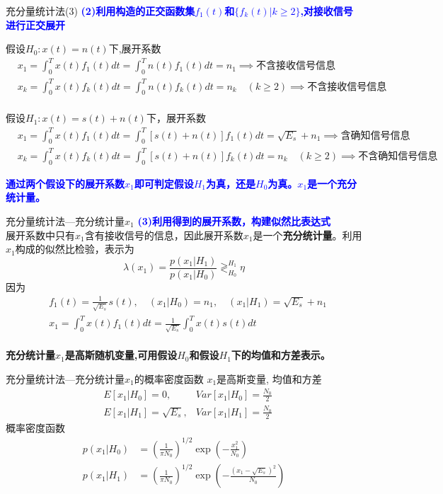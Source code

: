 \begin{frame}[shrink]{充分量统计法(3)}
\textbf{\textcolor{blue}{(2)利用构造的正交函数集$f_1(t)$和$\{f_k(t)|k\ge 2\}$,对接收信号进行正交展开}}
\begin{block}{假设$H_0:x(t)=n(t)$下,展开系数}
\begin{align*}
&x_1=\int_{0}^{T}x(t)f_1(t)dt=\int_{0}^{T}n(t)f_1(t)dt=n_1\implies\text{不含接收信号信息}\\
&x_k=\int_{0}^{T}x(t)f_k(t)dt=\int_{0}^{T}n(t)f_k(t)dt=n_k\quad (k\ge 2)\implies\text{不含接收信号信息}\\
\end{align*}
\end{block}
\begin{block}{假设$H_1:x(t)=s(t)+n(t)$下，展开系数}
\begin{align*}
&x_1=\int_{0}^{T}x(t)f_1(t)dt=\int_{0}^{T}[s(t)+n(t)]f_1(t)dt=\sqrt{E_s}+n_1\implies\text{含确知信号信息}\\
&x_k=\int_{0}^{T}x(t)f_k(t)dt=\int_{0}^{T}[s(t)+n(t)]f_k(t)dt=n_k\quad (k\ge 2)\implies\text{不含确知信号信息}
\end{align*}
\end{block}
\textbf{\textcolor{blue}{通过两个假设下的展开系数$x_1$即可判定假设$H_1$为真，还是$H_0$为真。$x_1$是一个充分统计量。}}
\end{frame}

\begin{frame}[shrink]{充分量统计法---充分统计量$x_1$}
\textbf{\textcolor{blue}{(3)利用得到的展开系数，构建似然比表达式
}}\\
展开系数中只有$x_1$含有接收信号的信息，因此展开系数$x_1$是一个\textbf{充分统计量}。利用$x_1$构成的似然比检验，表示为
\[\lambda(x_1)=\frac{p(x_1|H_1)}{p(x_1|H_0)}\mathop{\gtrless}_{H_0}^{H_1}\eta\]
因为
\begin{align*}
&f_1(t)=\frac{1}{\sqrt{E_s}}s(t),\quad (x_1|H_0)=n_1,\quad (x_1|H_1)=\sqrt{E_s}+n_1\\ &x_1=\int_{0}^{T}x(t)f_1(t)dt=\frac{1}{\sqrt{E_s}}\int_{0}^{T}x(t)s(t)dt
\end{align*}
~\\
\textbf{充分统计量$x_1$是高斯随机变量,可用假设$H_0$和假设$H_1$下的均值和方差表示。}
\end{frame}

\begin{frame}{充分量统计法---充分统计量$x_1$的概率密度函数}
$x_1$是高斯变量, 均值和方差
\begin{align*}
&E[x_1|H_0]=0,&Var[x_1|H_0]=\frac{N_0}{2}\\
&E[x_1|H_1]=\sqrt{E_s},&Var[x_1|H_1]=\frac{N_0}{2}
\end{align*}
概率密度函数
\begin{align*}
p(x_1|H_0)&=\left(\frac{1}{\pi N_0}\right)^{1/2}\exp\left(-\frac{x_1^2}{N_0}\right)\\
p(x_1|H_1)&=\left(\frac{1}{\pi N_0}\right)^{1/2}\exp\left(-\frac{(x_1-\sqrt{E_s})^2}{N_0}\right)
\end{align*}
\end{frame}

